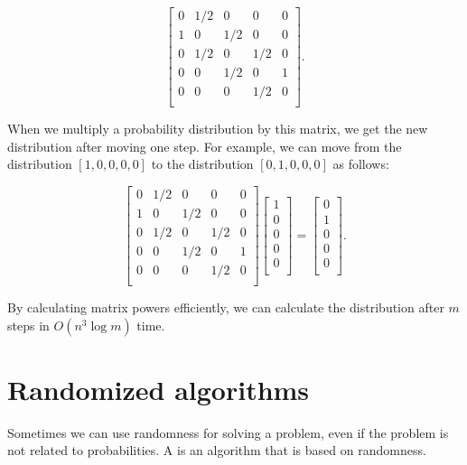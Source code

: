 \[
    \begin{bmatrix}
        0 & 1/2 & 0   & 0   & 0 \\
        1 & 0   & 1/2 & 0   & 0 \\
        0 & 1/2 & 0   & 1/2 & 0 \\
        0 & 0   & 1/2 & 0   & 1 \\
        0 & 0   & 0   & 1/2 & 0 \\
    \end{bmatrix}.
\]

When we multiply a probability distribution by this matrix,
we get the new distribution after moving one step.
For example, we can move from the distribution
$[1,0,0,0,0]$ to the distribution
$[0,1,0,0,0]$ as follows:

\[
    \begin{bmatrix}
        0 & 1/2 & 0   & 0   & 0 \\
        1 & 0   & 1/2 & 0   & 0 \\
        0 & 1/2 & 0   & 1/2 & 0 \\
        0 & 0   & 1/2 & 0   & 1 \\
        0 & 0   & 0   & 1/2 & 0 \\
    \end{bmatrix}
    \begin{bmatrix}
        1 \\
        0 \\
        0 \\
        0 \\
        0 \\
    \end{bmatrix}
    =
    \begin{bmatrix}
        0 \\
        1 \\
        0 \\
        0 \\
        0 \\
    \end{bmatrix}.
\]

By calculating matrix powers efficiently,
we can calculate the distribution after $m$ steps
in $O(n^3 \log m)$ time.

\section{Randomized algorithms}


Sometimes we can use randomness for solving a problem,
even if the problem is not related to probabilities.
A  is an algorithm that
is based on randomness.

